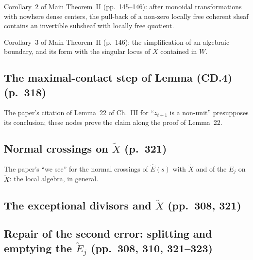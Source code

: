 



Corollary~2 of Main Theorem~II (pp.~145--146): after monoidal transformations with nowhere dense centers, the pull-back of
a non-zero locally free coherent sheaf contains an invertible subsheaf with locally free quotient.


Corollary~3 of Main Theorem~II (p.~146): the simplification of an algebraic boundary, and its form with the singular
locus of $X$ contained in $W$.


\subsection*{The maximal-contact step of Lemma (CD.4) (p.~318)}

The paper's citation of Lemma~22 of Ch.~III for ``$z_{t+1}$ is a non-unit'' presupposes its
conclusion; these nodes prove the claim along the proof of Lemma~22.


\subsection*{Normal crossings on $\tilde X$ (p.~321)}

The paper's ``we see'' for the normal crossings of $\hat E(s)$ with $\tilde X$ and of the $\tilde E_j$ on
$\tilde X$: the local algebra, in general.


\subsection*{The exceptional divisors and $\tilde X$ (pp.~308, 321)}


\subsection*{Repair of the second error: splitting and emptying the $\tilde E_j$ (pp.~308, 310, 321--323)}

